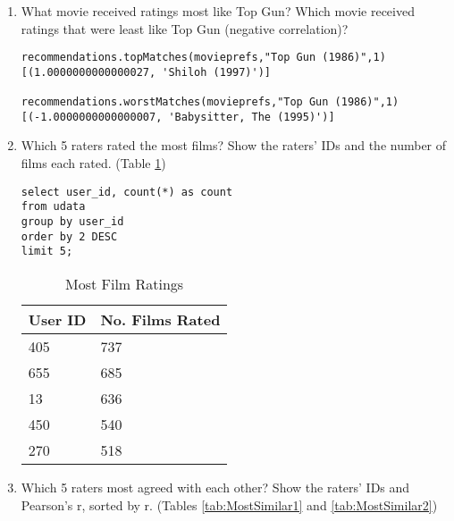 \documentclass[letterpaper,11pt]{report}
\begin{document}
\begin{savenotes}
\begin{enumerate}
\item What movie received ratings most like Top Gun? Which movie received ratings that were least like Top Gun (negative correlation)?

\begin{verbatim}
recommendations.topMatches(movieprefs,"Top Gun (1986)",1)
[(1.0000000000000027, 'Shiloh (1997)')]

recommendations.worstMatches(movieprefs,"Top Gun (1986)",1)
[(-1.0000000000000007, 'Babysitter, The (1995)')]
\end{verbatim}

\item Which 5 raters rated the most films? Show the raters' IDs and the number of films each rated. (Table \ref{tab:MostRatings})
\begin{verbatim}
select user_id, count(*) as count 
from udata 
group by user_id 
order by 2 DESC 
limit 5;
\end{verbatim}

\begin{table}[htbp]
\centering
    \begin{tabular}{|l|l|}
    \hline
    User ID & No. Films Rated \\ \hline
    405     & 737             \\ \hline
    655     & 685             \\ \hline
    13      & 636             \\ \hline
    450     & 540             \\ \hline
    270     & 518             \\ \hline
    \end{tabular}
    \caption {Most Film Ratings}
		\label{tab:MostRatings}
\end{table}

\item Which 5 raters most agreed with each other? Show the raters' IDs and Pearson's r, sorted by r. (Tables \ref{tab:MostSimilar1} and \ref{tab:MostSimilar2})


\end{enumerate}
\end{savenotes}
\end{document}
